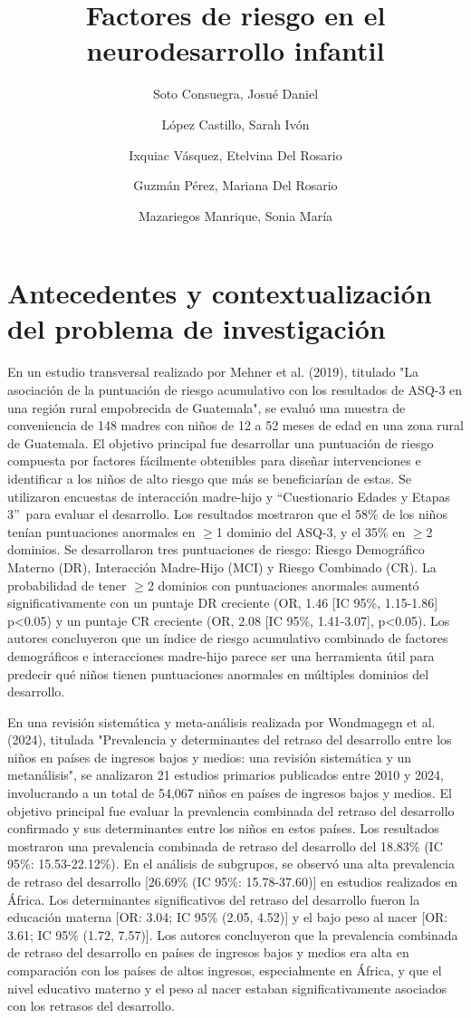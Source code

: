 \documentclass[11pt,letterpaper]{report}
\title{Factores de riesgo en el neurodesarrollo infantil}
\author{Soto Consuegra, Josué Daniel \and López Castillo, Sarah Ivón \and
Ixquiac Vásquez, Etelvina Del Rosario \and Guzmán Pérez, Mariana Del Rosario
\and Mazariegos Manrique, Sonia María}
\newcommand{\asq}{“Cuestionario Edades y Etapas 3”}
\begin{document}
	\tableofcontents
	\maketitle
	\chapter{Antecedentes y contextualización del problema de investigación}
En un estudio transversal realizado por Mehner et al. (2019), titulado "La
asociación de la puntuación de riesgo acumulativo con los resultados de ASQ-3
en una región rural empobrecida de Guatemala", se evaluó una muestra de
conveniencia de 148 madres con niños de 12 a 52 meses de edad en una zona
rural de Guatemala. El objetivo principal fue desarrollar una puntuación de
riesgo compuesta por factores fácilmente obtenibles para diseñar intervenciones
e identificar a los niños de alto riesgo que más se beneficiarían de estas.
Se utilizaron encuestas de interacción madre-hijo y \asq\ para evaluar el
desarrollo. Los resultados mostraron que el 58\% de los niños tenían
puntuaciones anormales en $\ge$1 dominio del ASQ-3, y el 35\% en $\ge$2
dominios. Se desarrollaron tres puntuaciones de riesgo: Riesgo Demográfico
Materno (DR), Interacción Madre-Hijo (MCI) y Riesgo Combinado (CR). La
probabilidad de tener $\ge$2 dominios con puntuaciones anormales aumentó
significativamente con un puntaje DR creciente (OR, 1.46 [IC 95\%, 1.15-1.86]
p<0.05) y un puntaje CR creciente (OR, 2.08 [IC 95\%, 1.41-3.07], p<0.05). Los
autores concluyeron que un índice de riesgo acumulativo combinado de factores
demográficos e interacciones madre-hijo parece ser una herramienta útil para
predecir qué niños tienen puntuaciones anormales en múltiples dominios del
desarrollo. \cite{CMehner2019}

En una revisión sistemática y meta-análisis realizada por Wondmagegn et al.
(2024), titulada "Prevalencia y determinantes del retraso del desarrollo entre
los niños en países de ingresos bajos y medios: una revisión sistemática y un
metanálisis", se analizaron 21 estudios primarios publicados entre 2010 y
2024, involucrando a un total de 54,067 niños en países de ingresos bajos y
medios. El objetivo principal fue evaluar la prevalencia combinada del retraso
del desarrollo confirmado y sus determinantes entre los niños en estos países.
Los resultados mostraron una prevalencia combinada de retraso del desarrollo
del 18.83\% (IC 95\%: 15.53-22.12\%). En el análisis de subgrupos, se observó
una alta prevalencia de retraso del desarrollo [26.69\% (IC 95\%: 15.78-37.60)]
en estudios realizados en África. Los determinantes significativos del retraso
del desarrollo fueron la educación materna [OR: 3.04; IC 95\% (2.05, 4.52)] y
el bajo peso al nacer [OR: 3.61; IC 95\% (1.72, 7.57)]. Los autores concluyeron
que la prevalencia combinada de retraso del desarrollo en países de ingresos
bajos y medios era alta en comparación con los países de altos ingresos,
especialmente en África, y que el nivel educativo materno y el peso al nacer
estaban significativamente asociados con los retrasos del desarrollo.
\cite{Wondmagegn2024}
\end{document}
